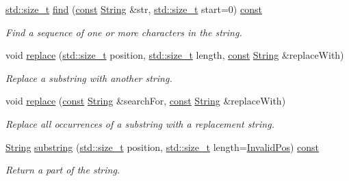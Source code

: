\begin{DoxyCompactItemize}
\hyperlink{nc__alloc_8h_a7b60c5629e55e8ec87a4547dd4abced4}{std\-::size\-\_\-t} \hyperlink{classsf_1_1_string_ae1fc8d6ced3b6082853f8013ea051b5c}{find} (\hyperlink{term__entry_8h_a57bd63ce7f9a353488880e3de6692d5a}{const} \hyperlink{classsf_1_1_string}{String} \&str, \hyperlink{nc__alloc_8h_a7b60c5629e55e8ec87a4547dd4abced4}{std\-::size\-\_\-t} start=0) \hyperlink{term__entry_8h_a57bd63ce7f9a353488880e3de6692d5a}{const} 
\begin{DoxyCompactList}\small\item\em Find a sequence of one or more characters in the string. \end{DoxyCompactList}\item 
void \hyperlink{classsf_1_1_string_ad460e628c287b0fa88deba2eb0b6744b}{replace} (\hyperlink{nc__alloc_8h_a7b60c5629e55e8ec87a4547dd4abced4}{std\-::size\-\_\-t} position, \hyperlink{nc__alloc_8h_a7b60c5629e55e8ec87a4547dd4abced4}{std\-::size\-\_\-t} length, \hyperlink{term__entry_8h_a57bd63ce7f9a353488880e3de6692d5a}{const} \hyperlink{classsf_1_1_string}{String} \&replace\-With)
\begin{DoxyCompactList}\small\item\em Replace a substring with another string. \end{DoxyCompactList}\item 
void \hyperlink{classsf_1_1_string_a82bbfee2bf23c641e5361ad505c07921}{replace} (\hyperlink{term__entry_8h_a57bd63ce7f9a353488880e3de6692d5a}{const} \hyperlink{classsf_1_1_string}{String} \&search\-For, \hyperlink{term__entry_8h_a57bd63ce7f9a353488880e3de6692d5a}{const} \hyperlink{classsf_1_1_string}{String} \&replace\-With)
\begin{DoxyCompactList}\small\item\em Replace all occurrences of a substring with a replacement string. \end{DoxyCompactList}\item 
\hyperlink{classsf_1_1_string}{String} \hyperlink{classsf_1_1_string_a5ee1913acbad01c24feec87d294f6529}{substring} (\hyperlink{nc__alloc_8h_a7b60c5629e55e8ec87a4547dd4abced4}{std\-::size\-\_\-t} position, \hyperlink{nc__alloc_8h_a7b60c5629e55e8ec87a4547dd4abced4}{std\-::size\-\_\-t} length=\hyperlink{classsf_1_1_string_a7dd58138a3f2bd887e5711879fd83570}{Invalid\-Pos}) \hyperlink{term__entry_8h_a57bd63ce7f9a353488880e3de6692d5a}{const} 
\begin{DoxyCompactList}\small\item\em Return a part of the string. \end{DoxyCompactList}\item 

\end{DoxyCompactItemize}
